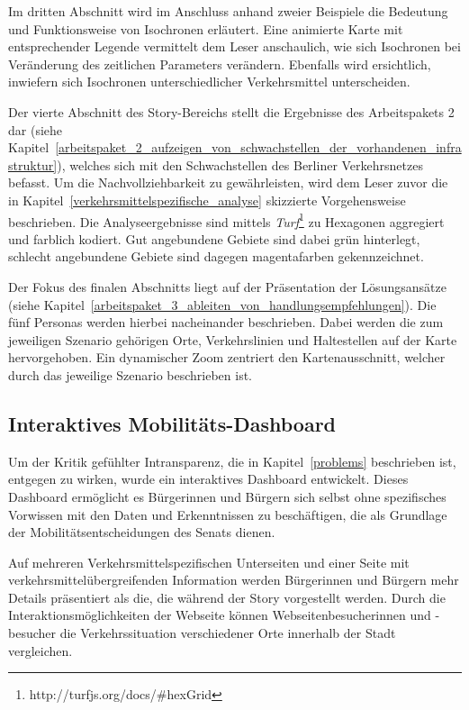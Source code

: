 Im dritten Abschnitt wird im Anschluss anhand zweier Beispiele die Bedeutung und Funktionsweise von Isochronen erläutert. Eine animierte Karte mit entsprechender Legende vermittelt dem Leser anschaulich, wie sich Isochronen bei Veränderung des zeitlichen Parameters verändern. Ebenfalls wird ersichtlich, inwiefern sich Isochronen unterschiedlicher Verkehrsmittel unterscheiden.

Der vierte Abschnitt des Story-Bereichs stellt die Ergebnisse des Arbeitspakets 2 dar (siehe Kapitel~\ref{arbeitspaket_2_aufzeigen_von_schwachstellen_der_vorhandenen_infrastruktur}), welches sich mit den Schwachstellen des Berliner Verkehrsnetzes befasst. Um die Nachvollziehbarkeit zu gewährleisten, wird dem Leser zuvor die in Kapitel~\ref{verkehrsmittelspezifische_analyse} skizzierte Vorgehensweise beschrieben. Die Analyseergebnisse sind mittels \emph{Turf}\footnote{http://turfjs.org/docs/\#hexGrid} zu Hexagonen aggregiert und farblich kodiert. Gut angebundene Gebiete sind dabei grün hinterlegt, schlecht angebundene Gebiete sind dagegen magentafarben gekennzeichnet.

Der Fokus des finalen Abschnitts liegt auf der Präsentation der Lösungsansätze (siehe Kapitel~\ref{arbeitspaket_3_ableiten_von_handlungsempfehlungen}). Die fünf Personas werden hierbei nacheinander beschrieben. Dabei werden die zum jeweiligen Szenario gehörigen Orte, Verkehrslinien und Haltestellen auf der Karte hervorgehoben. Ein dynamischer Zoom zentriert den Kartenausschnitt, welcher durch das jeweilige Szenario beschrieben ist.

\subsection{Interaktives Mobilitäts-Dashboard}
\label{interaktives_mobilitaets_dashboard}

Um der Kritik gefühlter Intransparenz, die in Kapitel~\ref{problems} beschrieben ist, entgegen zu wirken, wurde ein interaktives Dashboard entwickelt. Dieses Dashboard ermöglicht es Bürgerinnen und Bürgern sich selbst ohne spezifisches Vorwissen mit den Daten und Erkenntnissen zu beschäftigen, die als Grundlage der Mobilitätsentscheidungen des Senats dienen.

Auf mehreren Verkehrsmittelspezifischen Unterseiten und einer Seite mit verkehrsmittelübergreifenden Information werden Bürgerinnen und Bürgern mehr Details präsentiert als die, die während der Story vorgestellt werden. Durch die Interaktionsmöglichkeiten der Webseite können Webseitenbesucherinnen und -besucher die Verkehrssituation verschiedener Orte innerhalb der Stadt vergleichen.


